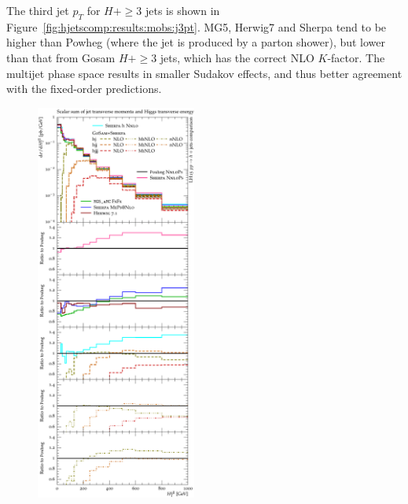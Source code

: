 {The third jet $p_T$ for $H+\ge3$ jets is shown in
Figure~\ref{fig:hjetscomp:results:mobs:j3pt}. MG5, Herwig7 and Sherpa
tend to be higher than Powheg (where the jet is produced by a parton
shower), but lower than that from Gosam $H+\ge3$ jets, which has the
correct NLO $K$-factor. The multijet phase space results in smaller
Sudakov effects, and thus better agreement with the fixed-order
predictions.

\begin{figure}[t!]
  \centering
  \includegraphics[width=0.47\textwidth]{figures/hjetscomp_u_HT_all.pdf}
  \hfill

\end{figure}}

